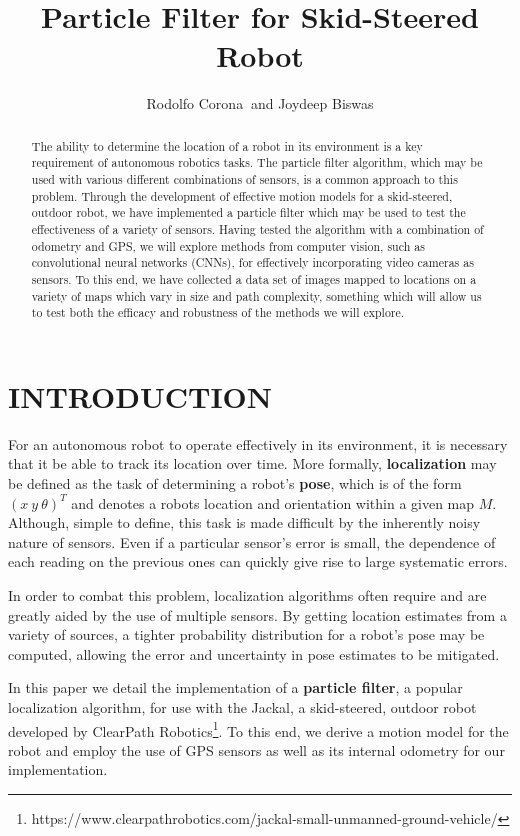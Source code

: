 \documentclass[letterpaper, 10 pt, conference]{ieeeconf}  %
\title{\LARGE \bf
Particle Filter for Skid-Steered Robot
}
\author{Rodolfo Corona%
$~$and Joydeep Biswas%
}
\begin{document}
\maketitle
\thispagestyle{empty}
\pagestyle{empty}


\begin{abstract}

The ability to determine the location of a robot in its environment is a key requirement of autonomous robotics tasks. The particle filter algorithm, which may be used with various different combinations of sensors, is a common approach to this problem. Through the development of effective motion models for a skid-steered, outdoor robot, we have implemented a particle filter which may be used to test the effectiveness of a variety of sensors. Having tested the algorithm with a combination of odometry and GPS, we will explore methods from computer vision, such as convolutional neural networks (CNNs), for effectively incorporating video cameras as sensors. To this end, we have collected a data set of images mapped to locations on a variety of maps which vary in size and path complexity, something which will allow us to test both the efficacy and robustness of the methods we will explore.

\end{abstract}


\section{INTRODUCTION}
For an autonomous robot to operate effectively in its environment, it is necessary that it be able to track its location over time. More formally, \textbf{localization} may be defined as the task of determining a robot's \textbf{pose}, which is of the form $(x~y~\theta)^T$ and denotes a robots location and orientation within a given map $M$. Although, simple to define, this task is made difficult by the inherently noisy nature of sensors. Even if a particular sensor's error is small, the dependence of each reading on the previous ones can quickly give rise to large systematic errors.  
\par
In order to combat this problem, localization algorithms often require and are greatly aided by the use of multiple sensors. By getting location estimates from a variety of sources, a tighter probability distribution for a robot's pose may be computed, allowing the error and uncertainty in pose estimates to be mitigated. 
\par
In this paper we detail the implementation of a \textbf{particle filter}, a popular localization algorithm, for use with the Jackal, a skid-steered, outdoor robot developed by ClearPath Robotics\footnote{https://www.clearpathrobotics.com/jackal-small-unmanned-ground-vehicle/}. To this end, we derive a motion model for the robot and employ the use of GPS sensors as well as its internal odometry for our implementation.
\end{document}

